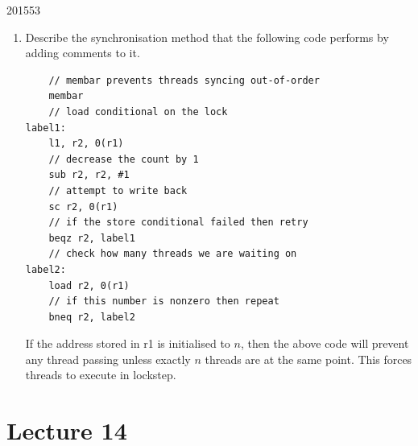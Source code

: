 \documentclass[10pt,\jkfside,a4paper]{article}
\begin{document}
\begin{enumerate}
\begin{examquestion}{2015}{5}{3}
\begin{enumerate}[label=(\alph*)]
\begin{enumerate}[label=(\roman*)]
\item Describe the synchronisation method that the following code performs
by adding comments to it.

\begin{lstlisting}
	// membar prevents threads syncing out-of-order
	membar
	// load conditional on the lock
label1:
	l1, r2, 0(r1)
	// decrease the count by 1
	sub r2, r2, #1
	// attempt to write back
	sc r2, 0(r1)
	// if the store conditional failed then retry
	beqz r2, label1
	// check how many threads we are waiting on
label2:
	load r2, 0(r1)
	// if this number is nonzero then repeat
	bneq r2, label2
\end{lstlisting}

If the address stored in r1 is initialised to $n$, then the above code will
prevent any thread passing unless exactly $n$ threads are at the same point.
This forces threads to execute in lockstep.

\end{enumerate}

\end{enumerate}

\end{examquestion}

\end{enumerate}

\section{Lecture 14}
\end{document}
